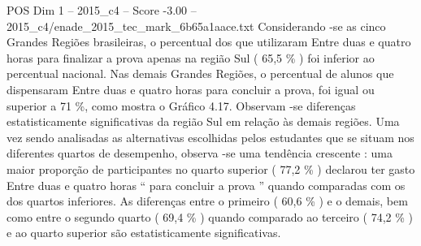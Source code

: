 \begin{textsample}{POS Dim 1 – 2015\_c4 – Score -3.00 – 2015\_c4/enade\_2015\_tec\_mark\_6b65a1aace.txt}
Considerando -se as cinco Grandes Regiões brasileiras, o percentual dos que utilizaram Entre duas e quatro horas para finalizar a prova apenas na região Sul ( 65,5 \% ) foi inferior ao percentual nacional.
Nas demais Grandes Regiões, o percentual de alunos que dispensaram Entre duas e quatro horas para concluir a prova, foi igual ou superior a 71 \%, como mostra o Gráfico 4.17.
Observam -se diferenças estatisticamente significativas da região Sul em relação às demais regiões.
Uma vez sendo analisadas as alternativas escolhidas pelos estudantes que se situam nos diferentes quartos de desempenho, observa -se uma tendência crescente : uma maior proporção de participantes no quarto superior ( 77,2 \% ) declarou ter gasto Entre duas e quatro horas “ para concluir a prova ” quando comparadas com os dos quartos inferiores.
As diferenças entre o primeiro ( 60,6 \% ) e o demais, bem como entre o segundo quarto ( 69,4 \% ) quando comparado ao terceiro ( 74,2 \% ) e ao quarto superior são estatisticamente significativas.

\end{textsample}
